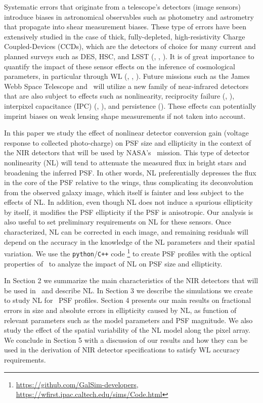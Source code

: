 \documentclass[11pt,preprint,flushrt]{aastex}
\begin{document}
Systematic errors that originate from a telescope's detectors (image sensors) introduce biases in astronomical observables such as photometry and astrometry that propagate into shear measurement biases. These type of errors have been extensively studied in the case of thick, fully-depleted, high-resistivity Charge Coupled-Devices (CCDs), which are the detectors of choice for many current and planned surveys such as DES, HSC, and LSST (\citealt{stubbs14}, \citealt{plazas14}, \citealt{gruen15}). It is of great importance to quantify the impact of these sensor effects on the inference of cosmological parameters, in particular through WL (\citealt{jarvis14}, \citealt{mandelbaum14b}, \citealt{meyers14}). Future missions such as the James Webb Space Telescope and \wfa\ will utilize a new family of near-infrared detectors that are also subject to effects such as nonlinearity, reciprocity failure (\citealt{bohlin05}, \citealt{biesiadzinski11}), interpixel capacitance (IPC) (\citealt{mccullough08}, \citealt{kannawadi15}), and persistence (\citealt{smith08}). These effects can potentially imprint biases on weak lensing shape measurements if not taken into account. 

In this paper we study the effect of nonlinear detector conversion gain (voltage response to collected photo-charge) on PSF size and ellipticity in the context of the NIR detectors that will be used by NASA's \wf\ mission. This type of detector nonlinearity (NL) will tend to attenuate the measured flux in bright stars and broadening the inferred PSF. In other words, NL preferentially depresses the flux in the core of the PSF relative to the wings, thus complicating its deconvolution from the observed galaxy image, which itself is fainter and less subject to the effects of NL. In addition, even though NL does not induce a spurious ellipticity by itself, it modifies the PSF ellipticity if the PSF is anisotropic. Our analysis is also useful to set preliminary requirements on NL for these sensors. Once characterized, NL can be corrected in each image, and remaining residuals will depend on the accuracy in the knowledge of the NL parameters and their spatial variation. We use the {\tt{python}}/{\tt{C++}} code \gs\footnote{\url{https://github.com/GalSim-developers}, \url{https://wfirst.ipac.caltech.edu/sims/Code.html}} \citep{rowe15} to create PSF profiles with the optical properties of \wfa\ to analyze the impact of NL on PSF size and ellipticity. 

In Section 2 we summarize the main characteristics of the NIR detectors that will be used in \wfa\, and describe NL. In Section 3 we describe the simulations we create to study NL for \wfa\ PSF profiles. Section 4 presents our main results on fractional errors in size and absolute errors in ellipticity caused by NL, as function of relevant parameters such as the model parameters and PSF magnitude. We also study the effect of the spatial variability of the NL model along the pixel array. We conclude in Section 5 with a discussion of our results and how they can be used in the derivation of NIR detector specifications to satisfy WL accuracy requirements.  
\end{document}
